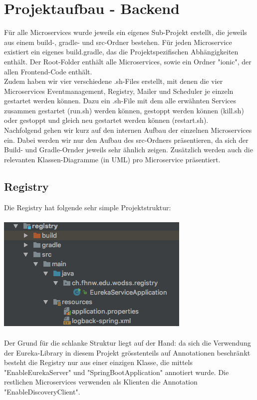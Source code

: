 \documentclass[11pt]{article} %
\begin{document}
\section{Projektaufbau - Backend}
Für alle Microservices wurde jeweils ein eigenes Sub-Projekt erstellt, die jeweils aus einem build-, gradle- und src-Ordner bestehen. Für jeden Microservice existiert ein eigenes build.gradle, das die Projektspezifischen Abhängigkeiten enthält.
Der Root-Folder enthält alle Microservices, sowie ein Ordner "ionic", der allen Frontend-Code enthält.
\\
Zudem haben wir vier verschiedene .sh-Files erstellt, mit denen die vier Microservices Eventmanagement, Registry, Mailer und Scheduler je einzeln gestartet werden können. Dazu ein .sh-File mit dem alle erwähnten Services zusammen gestartet (run.sh) werden können, gestoppt werden können (kill.sh) oder gestoppt und gleich neu gestartet werden können (restart.sh).
\\
Nachfolgend gehen wir kurz auf den internen Aufbau der einzelnen Microservices ein. Dabei werden wir nur den Aufbau des src-Ordners präsentieren, da sich der Build- und Gradle-Ornder jeweils sehr ähnlich zeigen. Zusätzlich werden auch die relevanten Klassen-Diagramme (in UML) pro Microservice präsentiert.

\subsection{Registry}
Die Registry hat folgende sehr simple Projektstruktur:
\\
\\
\includegraphics[scale=0.7]{structure_registry}
\\
\\
Der Grund für die schlanke Struktur liegt auf der Hand: da sich die Verwendung der Eureka-Library in diesem Projekt grösstenteils auf Annotationen beschränkt besteht die Registry nur aus einer einzigen Klasse, die mittels "EnableEurekaServer" und "SpringBootApplication" annotiert wurde. Die restlichen Microservices verwenden als Klienten die Annotation "EnableDiscoveryClient".
\end{document}
